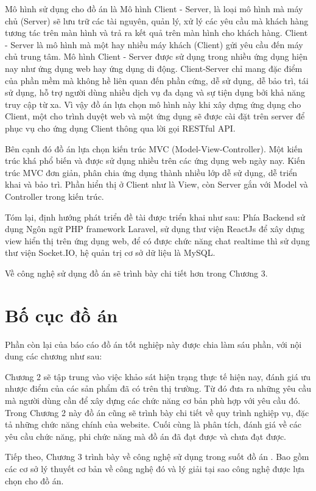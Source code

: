 \documentclass[../DoAn.tex]{subfiles}
\begin{document}
Mô hình sử dụng cho đồ án là Mô hình Client  - Server, là loại mô hình mà máy chủ (Server) sẽ lưu trữ các tài nguyên, quản lý,  xử lý các yêu cầu mà khách hàng tương tác trên màn hình và trả ra kết quả trên màn hình cho khách hàng. Client  - Server là mô hình mà một hay nhiều máy khách (Client) gửi yêu cầu đến máy chủ trung tâm\cite{ClientServer}. Mô hình Client - Server được sử dụng trong nhiều ứng dụng hiện nay như ứng dụng web hay ứng dụng di động. Client-Server chỉ mang đặc điểm của phần mềm mà không hề liên quan đến phần cứng, dễ sử dụng, dễ bảo trì, tái sử dụng, hỗ trợ người dùng nhiều dịch vụ đa dạng và sự tiện dụng bởi khả năng truy cập từ xa. Vì vậy đồ án lựa chọn mô hình này khi xây dựng ứng dụng cho Client, một cho trình duyệt web và một ứng dụng sẽ được cài đặt trên server để phục vụ cho ứng dụng Client thông qua lời gọi RESTful API. 

Bên cạnh đó đồ án lựa chọn kiến trúc MVC (Model-View-Controller). Một kiến trúc khá phổ biến và được sử dụng nhiều trên các ứng dụng web ngày nay. Kiến trúc MVC đơn giản, phân chia ứng dụng thành nhiều lớp dễ sử dụng, dễ triển khai và bảo trì. Phần hiển thị ở Client như là View, còn Server gắn với Model và Controller trong kiến trúc.

Tóm lại, định hướng phát triển đề tài được triển khai như sau: Phía Backend sử dụng Ngôn ngữ PHP framework Laravel, sử dụng thư viện ReactJs để xây dựng view hiển thị trên ứng dụng web, để có được chức năng chat realtime thì sử dụng thư viện Socket.IO, hệ quản trị cơ sở dữ liệu là MySQL.

Về công nghệ sử dụng đồ án sẽ trình bày chi tiết hơn trong Chương 3.
\section{Bố cục đồ án}
\label{section:1.4}
Phần còn lại của báo cáo đồ án tốt nghiệp này được chia làm sáu phần, với nội dung các chương như sau: 

Chương 2 sẽ tập trung vào việc khảo sát hiện trạng thực tế hiện nay, đánh giá ưu nhược điểm của các sản phẩm đã có trên thị trường. Từ đó đưa ra những yêu cầu mà người dùng cần để xây dựng các chức năng cơ bản phù hợp với yêu cầu đó. Trong Chương 2 này đồ án cũng sẽ trình bày chi tiết về quy trình nghiệp vụ, đặc tả những chức năng chính của website. Cuối cùng là phân tích, đánh giá về các yêu cầu chức năng, phi chức năng mà đồ án đã đạt được và chưa đạt được.

Tiếp theo, Chương 3 trình bày về công nghệ sử dụng trong suốt đồ án . Bao gồm các cơ sở lý thuyết cơ bản về công nghệ đó và lý giải tại sao công nghệ được lựa chọn cho đồ án. 
\end{document}

